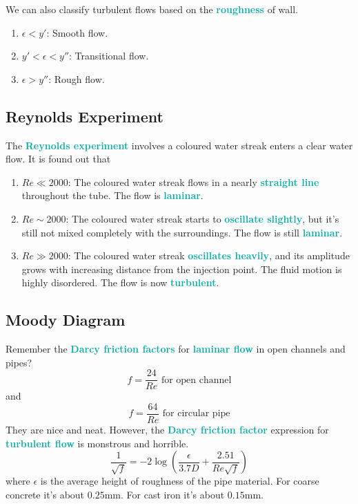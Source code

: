 \documentclass[twoside]{article}
\newcommand{\highlightbluetext}[1]{\textcolor[HTML]{09ACA6}{\textbf{#1}}}
\numberwithin{equation}{section}
\begin{document}
	We can also classify turbulent flows based on the \highlightbluetext{roughness} of wall.
	\begin{enumerate}
		\item $\epsilon < y'$: Smooth flow.
		\item $y' < \epsilon < y''$: Transitional flow.
		\item $\epsilon > y''$: Rough flow.
	\end{enumerate}
	
	\subsection{Reynolds Experiment}
	\label{subsec:ReynoldsExperiment}
	
	The \highlightbluetext{Reynolds experiment} involves a coloured water streak enters a clear water flow. It is found out that
	\begin{enumerate}
		\item $Re \ll 2000$: The coloured water streak flows in a nearly \highlightbluetext{straight line} throughout the tube. The flow is \highlightbluetext{laminar}.
		\item $Re \sim 2000$: The coloured water streak starts to \highlightbluetext{oscillate slightly}, but it's still not mixed completely with the surroundings. The flow is still \highlightbluetext{laminar}.
		\item $Re \gg 2000$: The coloured water streak \highlightbluetext{oscillates heavily}, and its amplitude grows with increasing distance from the injection point. The fluid motion is highly disordered. The flow is now \highlightbluetext{turbulent}.
	\end{enumerate}
	
	\subsection{Moody Diagram}
	\label{subsec:MoodyDiagram}
	
	Remember the \highlightbluetext{Darcy friction factors} for \highlightbluetext{laminar flow} in open channels and pipes?
	\begin{equation*}
		f = \frac{24}{Re} \text{ for open channel}
	\end{equation*}
	and
	\begin{equation*}
		f = \frac{64}{Re} \text{ for circular pipe}
	\end{equation*}
	They are nice and neat. However, the \highlightbluetext{Darcy friction factor} expression for \highlightbluetext{turbulent flow} is monstrous and horrible.
	\begin{equation}
		\frac{1}{\sqrt f} = -2\log \left( \frac{\epsilon}{3.7D}+\frac{2.51}{Re\sqrt f} \right)
		\label{eq:DarcyFrictionFactorTurbulent}
	\end{equation}
	where $\epsilon$ is the average height of roughness of the pipe material. For coarse concrete it's about $0.25 \unit{\milli \metre}$. For cast iron it's about $0.15 \unit{\milli \metre}$.
	
\end{document}
